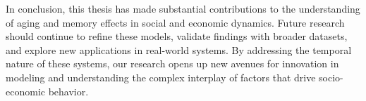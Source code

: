 In conclusion, this thesis has made substantial contributions to the understanding of aging and memory effects in social and economic dynamics. Future research should continue to refine these models, validate findings with broader datasets, and explore new applications in real-world systems. By addressing the temporal nature of these systems, our research opens up new avenues for innovation in modeling and understanding the complex interplay of factors that drive socio-economic behavior.
